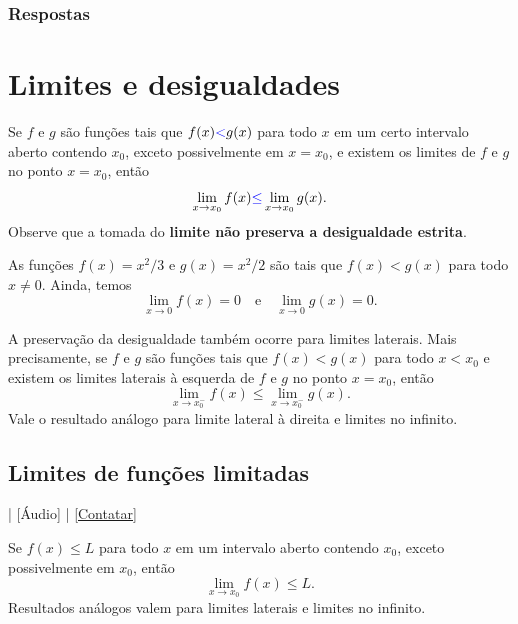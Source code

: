\ifisbook
\subsubsection{Respostas}
\shipoutAnswer
\fi

\section{Limites e desigualdades}\label{cap_lim_sec_limdes}

Se $f$ e $g$ são funções tais que $f(x){\color{blue}<}g(x)$ para todo $x$ em um certo intervalo aberto contendo $x_0$, exceto possivelmente em $x=x_0$, e existem os limites de $f$ e $g$ no ponto $x=x_0$, então
\begin{equation}
  \lim_{x\to x_0} f(x) {\color{blue}\leq} \lim_{x\to x_0} g(x).
\end{equation}
Observe que a tomada do {\bf limite não preserva a desigualdade estrita}.

\begin{ex}
  As funções $f(x) = x^2/3$ e $g(x) = x^2/2$ são tais que $f(x) < g(x)$ para todo $x\neq 0$. Ainda, temos
  \begin{equation}
    \lim_{x\to 0} f(x) = 0\quad\text{e}\quad\lim_{x\to 0} g(x) = 0.
  \end{equation}
\end{ex}

\begin{obs}
  A preservação da desigualdade também ocorre para limites laterais. Mais precisamente, se $f$ e $g$ são funções tais que $f(x)<g(x)$ para todo $x < x_0$ e existem os limites laterais à esquerda de $f$ e $g$ no ponto $x=x_0$, então
  \begin{equation}
    \lim_{x\to x_0^-} f(x) \leq \lim_{x\to x_0^-} g(x).
  \end{equation}
  Vale o resultado análogo para limite lateral à direita e limites no infinito.
\end{obs}

\subsection{Limites de funções limitadas}

\begin{flushright}
  [Vídeo] | [Áudio] | \href{https://phkonzen.github.io/notas/contato.html}{[Contatar]}
\end{flushright}

Se $f(x) \leq L$ para todo $x$ em um intervalo aberto contendo $x_0$, exceto possivelmente em $x_0$, então
\begin{equation}
  \lim_{x\to x_0} f(x) \leq L.
\end{equation}
Resultados análogos valem para limites laterais e limites no infinito.

